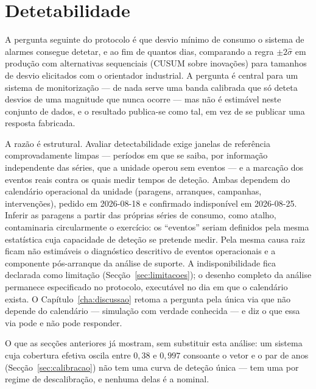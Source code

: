 \section{Detetabilidade}
\label{sec:detetabilidade}

A pergunta seguinte do protocolo é que desvio mínimo de consumo o sistema de alarmes
consegue detetar, e ao fim de quantos dias, comparando a regra
$\pm 2\hat\sigma$ em produção com alternativas sequenciais (CUSUM sobre
inovações) para tamanhos de desvio elicitados com o orientador industrial. A
pergunta é central para um sistema de monitorização --- de nada serve uma
banda calibrada que só deteta desvios de uma magnitude que nunca ocorre ---
mas não é estimável neste conjunto de dados, e o resultado publica-se como
tal, em vez de se publicar uma resposta fabricada.

A razão é estrutural. Avaliar detectabilidade exige janelas de referência
comprovadamente limpas --- períodos em que se saiba, por informação
independente das séries, que a unidade operou sem eventos --- e a marcação
dos eventos reais contra os quais medir tempos de deteção. Ambas dependem do
calendário operacional da unidade (paragens, arranques, campanhas,
intervenções), pedido em 2026-08-18 e confirmado indisponível em 2026-08-25.
Inferir as paragens a partir das próprias séries de consumo, como atalho,
contaminaria circularmente o exercício: os ``eventos'' seriam definidos pela
mesma estatística cuja capacidade de deteção se pretende medir. Pela mesma
causa raiz ficam não estimáveis o diagnóstico descritivo de eventos
operacionais e a componente pós-arranque da análise de suporte. A
indisponibilidade fica declarada como limitação
(Secção~\ref{sec:limitacoes}); o desenho completo da análise permanece
especificado no protocolo, executável no dia em que o calendário exista.
O Capítulo~\ref{cha:discussao} retoma a pergunta pela única via que não
depende do calendário --- simulação com verdade conhecida --- e diz o que
essa via pode e não pode responder.

O que as secções anteriores já mostram, sem substituir esta análise: um sistema cuja
cobertura efetiva oscila entre $0{,}38$ e $0{,}997$ consoante o vetor e o par
de anos (Secção~\ref{sec:calibracao}) não tem uma curva de deteção única
--- tem uma por regime de descalibração, e nenhuma delas é a nominal.


